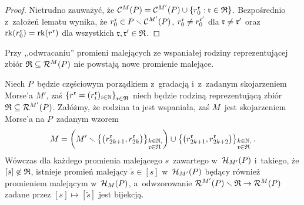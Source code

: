 \begin{proof}
Nietrudno zauważyć, że $\mathcal{C}^M(P)=\mathcal{C}^{M'}(P)\cup \left\{r_0^{\mathfrak{r}}:\mathfrak{r}\in\mathfrak{R}\right\}$. Bezpośrednio z~założeń lematu wynika, że $r^{\mathfrak{r}}_0\in P\smallsetminus \mathcal{C}^{M'}(P)$, $r^{\mathfrak{r}}_0\not=r^{\mathfrak{r}'}_0$ dla $\mathfrak{r}\not=\mathfrak{r}'$ oraz $\operatorname{rk}(r_0^{\mathfrak{r}})=\operatorname{rk}(r^{\mathfrak{r}})$ dla wszystkich $\mathfrak{r},\mathfrak{r}'\in\mathfrak{R}$.
\end{proof}

Przy ,,odwracaniu'' promieni malejących ze wspaniałej rodziny reprezentującej zbiór $\mathfrak{R}\subseteq\mathcal{R}^M(P)$ nie powstają nowe promienie malejące.

\begin{lem}\label{lem-wspaniali_reprezentanci_nie_tworza_promieni}
Niech $P$~będzie częściowym porządkiem z~gradacją i~z~zadanym skojarzeniem Morse'a $M'$, zaś $\left\{r^{\mathfrak{r}}=(r^{\mathfrak{r}}_i)_{i\in\mathbb{N}}\right\}_{\mathfrak{r}\in\mathfrak{R}}$ niech będzie rodziną reprezentującą zbiór $\mathfrak{R}\subseteq \mathcal{R}^{M'}(P)$. Załóżmy, że rodzina ta jest wspaniała, zaś $M$~jest skojarzeniem Morse'a na $P$~zadanym wzorem 
\[M=\left(M'\smallsetminus \left\{\left(r^{\mathfrak{r}}_{2k+1}, r^{\mathfrak{r}}_{2k}\right)\right\}_{\begin{subarray}{l}k\in\mathbb{N},\\ \mathfrak{r}\in\mathfrak{R}\end{subarray}}\right) \cup \left\{\left(r^{\mathfrak{r}}_{2k+1}, r^{\mathfrak{r}}_{2k+2}\right)\right\}_{\begin{subarray}{l}k\in\mathbb{N},\\ \mathfrak{r}\in\mathfrak{R}\end{subarray}}.\]
Wówczas dla każdego promienia malejącego $s$~zawartego w~$\mathcal{H}_{M'}(P)$ i~takiego, że $[s]\not\in \mathfrak{R}$, istnieje promień malejący $\tilde{s}\in [s]$ w~$\mathcal{H}_{M'}(P)$ będący również promieniem malejącym w~$\mathcal{H}_M(P)$, a~odwzorowanie $\mathcal{R}^{M'}(P)\smallsetminus \mathfrak{R} \to\mathcal{R}^M(P)$ zadane przez $[s]\mapsto[\tilde{s}]$
 jest bijekcją.
\end{lem}
